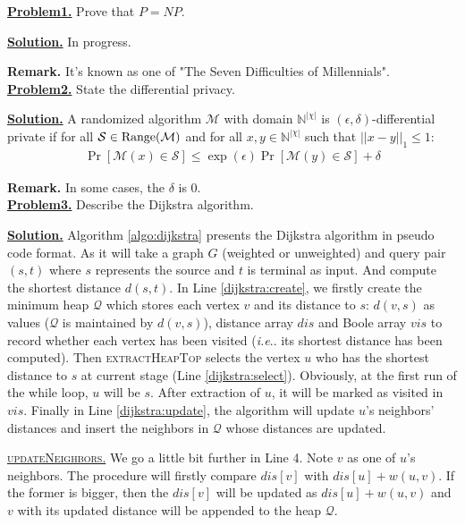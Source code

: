 \documentclass[danish,a4paper,11pt]{scrartcl}
\makeatletter
\newcommand{\NN}{\mathbb N}
\DeclareRobustCommand\onedot{\futurelet\@let@token\@onedot}
\def\@onedot{\ifx\@let@token.\else.\null\fi\xspace}
\def\ie{\emph{i.e}\onedot} \def\Ie{\emph{I.e}\onedot}
\newcommand{\solution}{\noindent\underline{\textbf{Solution.}} }
\newcommand{\remark}{\textbf{Remark.} }
\makeatother
\begin{document}



\noindent\underline{\textbf{Problem1.}} \textsf{\color{blue} Prove that $P=NP$.}

\solution In progress. 

\remark It's known as one of "The Seven Difficulties of Millennials". \\


\noindent\underline{\textbf{Problem2.}} \textsf{\color{blue} State the differential privacy.}

\solution A randomized algorithm $\mathcal{M}$ with domain $\NN^{|\chi|}$ is $(\epsilon, \delta)$-differential private if for all $\mathcal{S} \in \textnormal{Range}(\mathcal{M})$ and for all $x, y \in \NN^{|\chi|}$ such that $||x-y||_1 \leq 1$:
\begin{align} \label{equ:dp}
    \Pr[\mathcal{M}(x) \in \mathcal{S}] \leq \exp{(\epsilon)} \Pr[\mathcal{M}(y) \in \mathcal{S}] + \delta
\end{align} 

\remark In some cases, the $\delta$ is $0$. \\


\noindent\underline{\textbf{Problem3.}} \textsf{\color{blue} Describe the Dijkstra algorithm}.

\solution Algorithm \ref{algo:dijkstra} presents the Dijkstra algorithm in pseudo code format. As it will take a graph $G$ (weighted or unweighted) and query pair $(s, t)$ where $s$ represents the source and $t$ is terminal as input. And compute the shortest distance $d(s, t)$. In Line \ref{dijkstra:create}, we firstly create the minimum heap $\mathcal{Q}$ which stores each vertex $v$ and its distance to $s$: $d(v, s)$ as values ($\mathcal{Q}$ is maintained by $d(v, s)$), distance array $dis$ and Boole array $vis$ to record whether each vertex has been visited (\ie its shortest distance has been computed). Then \textsc{extractHeapTop} selects the vertex $u$ who has the shortest distance to $s$ at current stage (Line \ref{dijkstra:select}). Obviously, at the first run of the while loop, $u$ will be $s$. After extraction of $u$, it will be marked as visited in $vis$. Finally in Line \ref{dijkstra:update}, the algorithm will update $u$'s neighbors' distances and insert the neighbors in $\mathcal{Q}$ whose distances are updated.

\underline{\textsc{updateNeighbors.}} We go a little bit further in Line 4. Note $v$ as one of $u$'s neighbors. The procedure will firstly compare $dis[v]$ with $dis[u] + w(u, v)$. If the former is bigger, then the $dis[v]$ will be updated as $dis[u] + w(u, v)$ and $v$ with its updated distance will be appended to the heap $\mathcal{Q}$.
\end{document}
